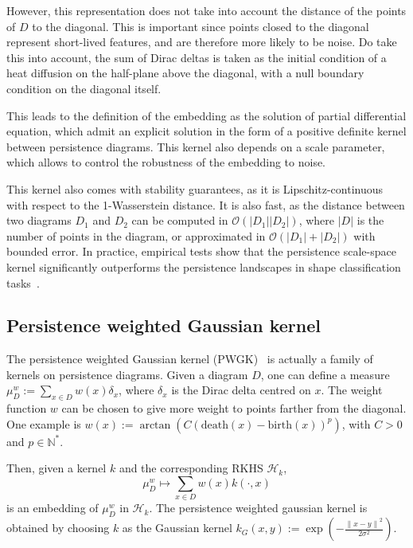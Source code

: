 \documentclass[a4paper,11pt,openany,extrafontsizes]{memoir}
\begin{document}
However, this representation does not take into account the distance
of the points of $D$ to the diagonal. This is important since points
closed to the diagonal represent short-lived features, and are
therefore more likely to be noise. Do take this into account, the sum
of Dirac deltas is taken as the initial condition of a heat diffusion
on the half-plane above the diagonal, with a null boundary condition
on the diagonal itself.

This leads to the definition of the embedding as the solution of
partial differential equation, which admit an explicit solution in the
form of a positive definite kernel between persistence diagrams. This
kernel also depends on a scale parameter, which allows to control the
robustness of the embedding to noise.

This kernel also comes with stability guarantees, as it is
Lipschitz-continuous with respect to the 1-Wasserstein distance. It is
also fast, as the distance between two diagrams $D_1$ and $D_2$ can be
computed in $\mathcal{O}(\lvert D_1 \rvert \lvert D_2 \rvert)$, where
$\lvert D \rvert$ is the number of points in the diagram, or
approximated in $\mathcal{O}(\lvert D_1 \rvert + \lvert D_2 \rvert)$
with bounded error. In practice, empirical tests show that the
persistence scale-space kernel significantly outperforms the
persistence landscapes in shape classification
tasks~\cite{reininghaus_stable_2015}.

\subsection{Persistence weighted Gaussian kernel}%
\label{sec:pers-weight-gauss}

The persistence weighted Gaussian kernel
(PWGK)~\cite{kusano_kernel_2017} is actually a family of kernels on
persistence diagrams. Given a diagram $D$, one can define a measure
$\mu_D^w := \sum_{x\in D} w(x) \delta_x$, where $\delta_x$ is the
Dirac delta centred on $x$. The weight function $w$ can be chosen to
give more weight to points farther from the diagonal. One example is
$w(x) := \arctan\left(C {(\mathrm{death}(x) -
    \mathrm{birth}(x))}^p\right)$, with $C>0$ and $p\in\mathbb{N}^*$.

Then, given a kernel $k$ and the corresponding RKHS $\mathcal{H}_k$,
\[ \mu_D^w \mapsto \sum_{x\in D} w(x) k(\cdot, x) \] is an embedding
of $\mu_D^w$ in $\mathcal{H}_k$. The persistence weighted gaussian
kernel is obtained by choosing $k$ as the Gaussian kernel
$k_G(x,y) := \exp\left(-\frac{{\lVert x-y \rVert}^2}{2\sigma^2}
\right)$.
\end{document}
